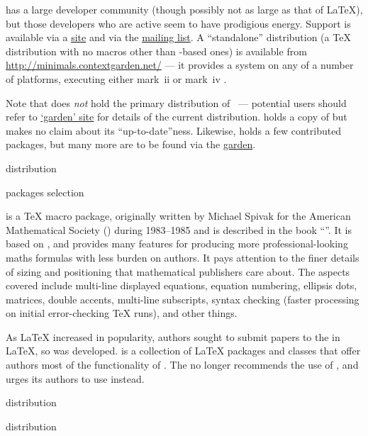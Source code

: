 \context{} has a large developer community (though possibly not as
large as that of \LaTeX{}), but those developers who are active seem to have
prodigious energy.  Support is available via a %
\href{http://wiki.contextgarden.net/Main_Page}{ site} and via the
\href{http://www.ntg.nl/mailman/listinfo/ntg-context}{mailing list}.
A ``standalone'' distribution (a \TeX{} distribution with no macros
other than \context{}-based ones) is available from
\url{http://minimals.contextgarden.net/} --- it provides
a \context{} system on any of a number of platforms, executing either
mark~ii or mark~iv \context{}.

Note that  does \emph{not} hold the primary distribution of
\context{}~--- potential users should refer to
\href{http://contextgarden.net}{\context{} `garden' site} for details
of the
current distribution.   holds a copy of \CONTeXT{} but
makes no claim about its ``up-to-date''ness.  Likewise, 
holds a few contributed \context{} packages, but many more are to be
found via the \href{http://contextgarden.net}{\CONTeXT{} garden}.
\begin{ctanrefs}
\item[\nothtml{\rmfamily}\CONTeXT{} distribution]
\item[\nothtml{\rmfamily}\CONTeXT{} packages selection]
\end{ctanrefs}


\AMSTeX{} is a \TeX{} macro package, originally written by Michael Spivak for
the American Mathematical Society () during 1983--1985 and
is described in the book ``''.
It is based on \plaintex{}, and provides many
features for producing more professional-looking maths formulas with
less burden on authors.  It pays attention to the finer details of
sizing and positioning that mathematical publishers care about. The
aspects covered include multi-line displayed equations, equation
numbering, ellipsis dots, matrices, double accents, multi-line
subscripts, syntax checking (faster processing on initial
error-checking \TeX{} runs), and other things.

As \LaTeX{} increased in popularity, authors sought to submit papers to
the  in \LaTeX{}, so \AMSLaTeX{} was developed.  \AMSLaTeX{}
is a collection of \LaTeX{} packages and classes that offer authors most of
the functionality of \AMSTeX{}.
The  no longer recommends the use of \AMSTeX{}, and urges
its authors to use \AMSLaTeX{} instead.
\begin{ctanrefs}
\item[\nothtml{\rmfamily}\AMSTeX{} distribution]
\item[\nothtml{\rmfamily}\AMSLaTeX{} distribution]
\end{ctanrefs}

